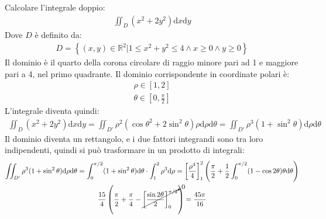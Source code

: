\documentclass{article}
\newcommand{\df}{\mathrm{d}}
\numberwithin{equation}{subsection}
\begin{document}
Calcolare l'integrale doppio:
\begin{gather*}
    \iint_D(x^2+2y^2)\df x\df y
\end{gather*}
Dove $D$ è definito da:
\begin{gather*}
    D=\left\{(x,y)\in\mathbb{R}^2\big|1\leq x^2+y^2\leq4\land x\geq0\land y\geq0\right\}
\end{gather*}
Il dominio è il quarto della corona circolare di raggio minore pari ad 1 e maggiore pari a 4, nel primo quadrante. 
Il dominio corrispondente in coordinate polari è:
\begin{gather*}
    \rho\in[1,2]\\
    \theta\in\left[0,\frac{\pi}{2}\right]
\end{gather*}
L'integrale diventa quindi:
\begin{gather*}
    \iint_D(x^2+2y^2)\df x\df y=
    \iint_{D'}\rho^2(\cos\theta^2+2\sin^2\theta)\rho\df\rho\df\theta=
    \iint_{D'}\rho^3(1+\sin^2\theta)\df\rho\df\theta
\end{gather*}
Il dominio diventa un rettangolo, e i due fattori integrandi sono tra loro indipendenti, quindi si può trasformare in un prodotto di integrali:
\begin{gather*}
    \iint_{D'}\rho^3(1+\sin^2\theta)\df\rho\df\theta=
    \int_0^{\pi/2}(1+\sin^2\theta)\df\theta\cdot\int_1^2\rho^3\df\rho=
    \left[\frac{\rho^4}{4}\right]_1^2\left(\frac{\pi}{2}+\frac{1}{2}\int_0^{\pi/2}(1-\cos2\theta)\theta\df\theta\right)\\
    \frac{15}{4}\left(\frac{\pi}{2}+\frac{\pi}{4}-\cancelto{0}{\left[\frac{\sin2\theta}{2}\right]_0^{\pi/2}}\right)=\frac{45\pi}{16}
\end{gather*}
\end{document}

